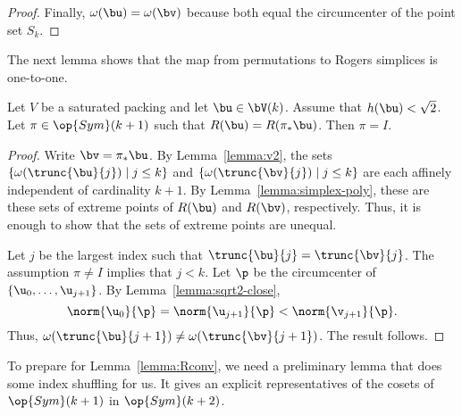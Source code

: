 \begin{proof}
Finally, $\omega(\bu) = \omega(\bv)$ because both equal the circumcenter of the
point set $S_k$.
%
\end{proof}

The next lemma shows that the map from permutations to Rogers simplices is one-to-one.

\begin{lemma} 
  Let $V$ be a saturated packing and let $\bu\in
  \bV(k)$.  Assume that $h(\bu)<\sqrt2$.  Let $\pi\in\op{Sym}(k+1)$ such that
 $R(\bu)= R(\pi_*\bu)$.  Then $\pi= I$.
\end{lemma}

\begin{proof} 
Write $\bv = \pi_*\bu$.  By Lemma~\ref{lemma:v2}, the sets
$\{\omega(\trunc{\bu}{j})\mid j\le k\}$ and 
$\{\omega(\trunc{\bv}{j})\mid j\le k\}$ are each affinely independent of
cardinality $k+1$.  By Lemma~\ref{lemma:simplex-poly}, these are these sets
of extreme points of $R(\bu)$ and $R(\bv)$, respectively.  Thus, it is enough
to show that the sets of extreme points are unequal.

Let $j$ be the largest index such that $\trunc{\bu}{j}=\trunc{\bv}{j}$.
The assumption $\pi\ne I$ implies that $j<k$.  Let $\p$ be the circumcenter
of $\{\u_0,\ldots,\u_{j+1}\}$.  By Lemma~\ref{lemma:sqrt2-close}, 
\[  
\norm{\u_0}{\p} = \norm{\u_{j+1}}{\p} < \norm{\v_{j+1}}{\p}.
\] 
Thus, $\omega(\trunc{\bu}{j+1}) \ne \omega(\trunc{\bv}{j+1})$.  The result follows.
\end{proof}

To prepare for Lemma~\ref{lemma:Rconv}, we need a preliminary lemma that
does some index shuffling for us.  It gives an  explicit representatives of the
cosets of $\op{Sym}(k+1)$ in $\op{Sym}(k+2)$.


